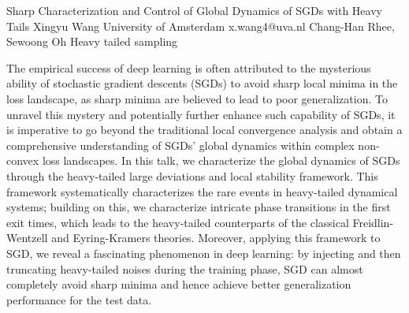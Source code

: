 \begin{talk}
  {Sharp Characterization and Control of Global Dynamics of SGDs with Heavy Tails}%
  {Xingyu Wang}%
  {University of Amsterdam}%
  {x.wang4@uva.nl}%
  {Chang-Han Rhee, Sewoong Oh}%
  {Heavy tailed sampling }%
    
   
The empirical success of deep learning is often attributed to the mysterious ability of stochastic gradient descents (SGDs) to avoid sharp local minima in the loss landscape, as sharp minima are believed to lead to poor generalization. To unravel this mystery and potentially further enhance such capability of SGDs, it is imperative to go beyond the traditional local convergence analysis and obtain a comprehensive understanding of SGDs' global dynamics within complex non-convex loss landscapes. In this talk, we characterize the global dynamics of SGDs through the heavy-tailed large deviations and local stability framework. This framework systematically characterizes the rare events in heavy-tailed dynamical systems; building on this, we characterize intricate phase transitions in the first exit times, which leads to the heavy-tailed counterparts of the classical Freidlin-Wentzell and Eyring-Kramers theories. Moreover, applying this framework to SGD, we reveal a fascinating phenomenon in deep learning: by injecting and then truncating heavy-tailed noises during the training phase, SGD can almost completely avoid sharp minima and hence achieve better generalization performance for the test data.



\end{talk}
